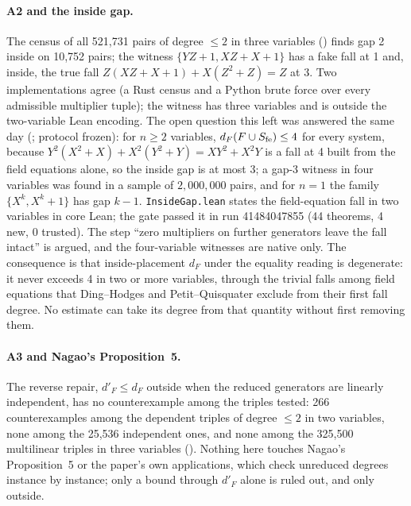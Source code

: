 \paragraph{A2 and the inside gap.} The census of all 521{,}731 pairs of
degree $\le2$ in three variables ()
finds gap 2 inside on 10{,}752 pairs; the witness $\{YZ+1,XZ+X+1\}$ has a
fake fall at 1 and, inside, the true fall
$Z(XZ+X+1)+X(Z^2+Z)=Z$ at 3. Two implementations agree (a Rust census and a
Python brute force over every admissible multiplier tuple); the witness has
three variables and is outside the two-variable Lean encoding. The open
question this left was answered the same day
(; protocol frozen): for
$n\ge2$ variables, $d_F(F\cup S_{\rm fe})\le4$ for every system, because
$Y^2(X^2+X)+X^2(Y^2+Y)=XY^2+X^2Y$ is a fall at 4 built from the field
equations alone, so the inside gap is at most 3; a gap-3 witness in four
variables was found in a sample of $2{,}000{,}000$ pairs, and for $n=1$ the
family $\{X^k,X^k+1\}$ has gap $k-1$. \texttt{InsideGap.lean} states the
field-equation fall in two variables in core Lean; the gate passed it in
run 41484047855 (44 theorems, 4 new, 0 trusted). The step ``zero multipliers
on further generators leave the fall intact'' is argued, and the
four-variable witnesses are native only. The consequence is that
inside-placement $d_F$ under the equality reading is degenerate: it never
exceeds 4 in two or more variables, through the trivial falls among field
equations that Ding--Hodges and Petit--Quisquater exclude from their first
fall degree. No estimate can take its degree from that quantity without
first removing them.

\paragraph{A3 and Nagao's Proposition~5.} The reverse repair, $d'_F\le d_F$
outside when the reduced generators are linearly independent, has no
counterexample among the triples tested: 266 counterexamples among the
dependent triples of degree $\le2$ in two variables, none among the 25{,}536
independent ones, and none among the 325{,}500 multilinear triples in three
variables (). Nothing here
touches Nagao's Proposition~5 or the paper's own applications, which check
unreduced degrees instance by instance; only a bound through $d'_F$ alone is
ruled out, and only outside.

